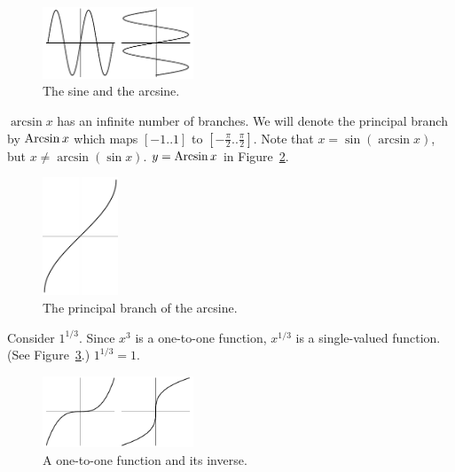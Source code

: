 \begin{figure}[h!]
\begin{center}
\includegraphics[width=0.4\textwidth]{algebra/sets/yesxyeax}
\end{center}
\caption{The sine and the arcsine.}
\label{yesxyeax}
\end{figure}






\begin{Example}
$\arcsin x$ has an infinite number of branches.  We will denote the
principal branch by $\mathop{\mathrm{Arcsin}}\nolimits x$ which maps $[-1..1]$ to 
$\left[ -\frac{\pi}{2}.. \frac{\pi}{2} \right]$.
Note that $x = \sin(\arcsin x)$, but $x \neq \arcsin( \sin x )$.
$y = \mathop{\mathrm{Arcsin}}\nolimits x$ in Figure~\ref{yepbax}.
\begin{figure}[h!]
\begin{center}
\includegraphics[width=0.2\textwidth]{algebra/sets/yepbax}
\end{center}
\caption{The principal branch of the arcsine.}
\label{yepbax}
\end{figure}
\end{Example}







\begin{Example}
Consider $1^{1/3}$.
Since $x^3$ is a one-to-one function, $x^{1/3}$ is a single-valued function.
(See Figure~\ref{yexcyecx}.) $1^{1/3} = 1$.
\begin{figure}[h!]
\begin{center}
\includegraphics[width=0.4\textwidth]{algebra/sets/yexcyecx}
\end{center}
\caption{A one-to-one function and its inverse.}
\label{yexcyecx}
\end{figure}
\end{Example}








